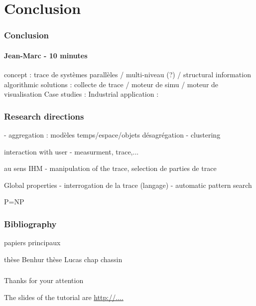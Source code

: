 \section{Conclusion}

\frame
{
  \frametitle{Conclusion}
  \framesubtitle{Jean-Marc - 10 minutes}
  concept : trace de systèmes parallèles / multi-niveau (?) / structural information
  algorithmic solutions : collecte de trace / moteur de simu / moteur de visualisation
  Case studies : 
  Industrial application :
}

\frame
{
  \frametitle{Research directions}
  
- aggregation : modèles temps/espace/objets désagrégation
- clustering

interaction with user 
- measurment, trace,...

au sens IHM
- manipulation of the trace, selection de parties de trace

Global properties
- interrogation de la trace (langage)
- automatic  pattern search

P=NP
}
\begin{frame}
\frametitle{Bibliography}
papiers principaux


thèse Benhur
thèse Lucas
chap chassin
\end{frame}
\begin{frame}
\frametitle{}
Thanks for your attention


The slides of the tutorial are \url{http://....}
\end{frame}
